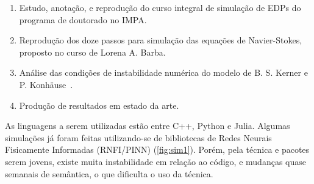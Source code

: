 \documentclass[12pt, brazilian]{article}
\begin{document}
\begin{enumerate}
\item Estudo, anotação, e reprodução do curso integral de simulação de EDPs do programa de doutorado no IMPA.
\item Reprodução dos doze passos para simulação das equações de Navier-Stokes, proposto no curso de Lorena A. Barba.








\item Análise das condições de instabilidade numérica do modelo de B. S. Kerner e P. Konhäuse~\cite{kerner1993cluster}.
\item Produção de resultados em estado da arte.
\end{enumerate}

As linguagens a serem utilizadas estão entre C++, Python e Julia. Algumas simulações já foram feitas utilizando-se de bibliotecas de Redes Neurais Fisicamente Informadas (RNFI/PINN) (\autoref{fig:sim1}). Porém, pela técnica e pacotes serem jovens, existe muita instabilidade em relação ao código, e mudanças quase semanais de semântica, o que dificulta o uso da técnica.
\end{document}
